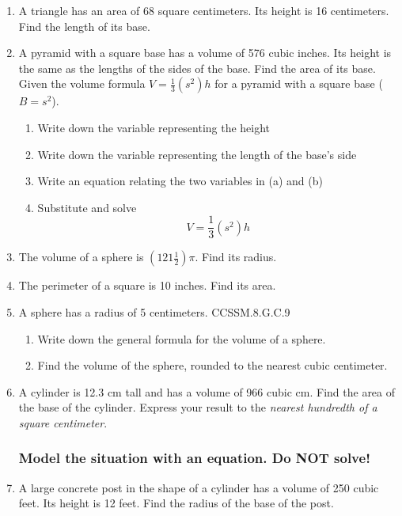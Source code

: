 \begin{enumerate}
\newpage
\item A triangle has an area of 68 square centimeters. Its height is 16 centimeters. Find the length of its base. \vspace{3cm}

\item A pyramid with a square base has a volume of 576 cubic inches. Its height is the same as the lengths of the sides of the base. Find the area of its base.\\[0.5cm] Given the volume formula $V=\frac{1}{3}(s^2)h$ for a pyramid with a square base ($B=s^2$).
\begin{enumerate}[itemsep=0.5cm]
  \item Write down the variable representing the height
  \item Write down the variable representing the length of the base's side
  \item Write an equation relating the two variables in (a) and (b)
  \item Substitute and solve \[V=\frac{1}{3}(s^2)h\]
\end{enumerate} \vspace{2cm}

\item The volume of a sphere is $(121 \frac{1}{2}) \pi$. Find its radius. \vspace{4cm}

\item The perimeter of a square is 10 inches. Find its area. \vspace{4cm}

\newpage
\item A sphere has a radius of 5 centimeters. \hfill CCSSM.8.G.C.9
\begin{enumerate}
  \item Write down the general formula for the volume of a sphere. \vspace{1cm}
  \item Find the volume of the sphere, rounded to the nearest cubic centimeter.
\end{enumerate}  \vspace{3cm}

\item A cylinder is 12.3 cm tall and has a volume of 966 cubic cm. Find the area of the base of the cylinder. Express your result to the \emph{nearest hundredth of a square centimeter}. \vspace{3cm}

\subsubsection*{Model the situation with an equation. \hfill Do NOT solve!}
\item A large concrete post in the shape of a cylinder has a volume of 250 cubic feet. Its height is 12 feet. Find the radius of the base of the post. \vspace{2cm}


\end{enumerate}
